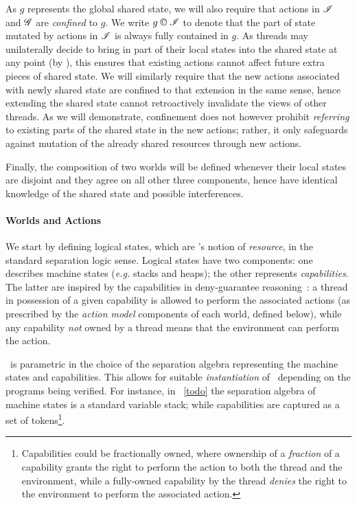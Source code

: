As $g$ represents the global shared state, we will also require that actions in $\mathscr{I}$ and $\mathscr{G}$ are \emph{confined} to $g$.  We write $g \containI \lmod$ to denote that the part of state mutated by actions in $\mathscr{I}$ is always fully contained in $g$. As threads may unilaterally decide to bring in part of their local states into the shared state at any point (by \extendRule), this ensures that existing actions cannot affect future extra pieces of shared state. We will similarly require that the new actions associated with newly shared state are confined to that extension in the same sense, hence extending the shared state cannot retroactively invalidate the views of other threads. As we will demonstrate, confinement does not however prohibit \emph{referring} to existing parts of the shared state in the new actions; rather, it only safeguards against mutation of the already shared resources through new actions.

Finally, the composition of two worlds will be defined whenever their local states are disjoint and they agree on all other three components, hence have identical knowledge of the shared state and possible interferences.

\paragraph{Worlds and Actions}
We start by defining logical states, which are \colosl's notion of \emph{resource}, in the standard separation logic sense. Logical states have two components: one describes machine states (\textit{e.g.} stacks and heaps); the other
represents \emph{capabilities}. The latter are inspired by the capabilities in deny-guarantee reasoning~\cite{dg}: a thread in possession of a given capability is allowed to perform the associated actions (as prescribed by the \emph{action model} components of each world, defined below), while any capability \emph{not} owned by a thread means that the environment can perform the action.

\colosl\ is parametric in the choice of the separation algebra representing the machine states and capabilities. This allows for suitable \emph{instantiation} of \colosl\ depending on the programs being verified. For instance, in \ex~\ref{todo} the separation algebra of machine states is a standard variable stack; while capabilities are captured as a set of tokens\footnote{Capabilities could be fractionally owned, where ownership of a \emph{fraction} of a capability grants the right to perform the action to both the thread and the environment, while a fully-owned capability by the thread \emph{denies} the right to the environment to perform the associated action.}.

